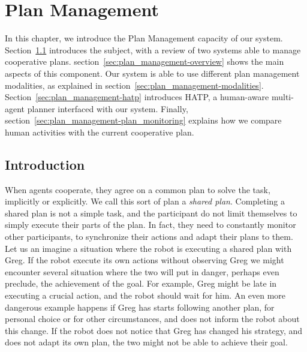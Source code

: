 
\chapter{Plan Management} %

\label{chapter:plan_management} %


In this chapter, we introduce the Plan Management capacity of our system. Section~\ref{sec:plan_management-intro} introduces the subject, with a review of two systems able to manage cooperative plans. section~\ref{sec:plan_management-overview} shows the main aspects of this component. Our system is able to use different plan management modalities, as explained in section~\ref{sec:plan_management-modalities}. Section~\ref{sec:plan_management-hatp} introduces HATP, a human-aware multi-agent planner interfaced with our system. Finally, section~\ref{sec:plan_management-plan_monitoring} explains how we compare human activities with the current cooperative plan.

\section{Introduction}
\label{sec:plan_management-intro}

When agents cooperate, they agree on a common plan to solve the task, implicitly or explicitly. We call this sort of plan a \textit{shared plan}. Completing a shared plan is not a simple task, and the participant do not limit themselves to simply execute their parts of the plan. In fact, they need to constantly monitor other participants, to synchronize their actions and adapt their plans to them. Let us an imagine a situation where the robot is executing a shared plan with Greg. If the robot execute its own actions without observing Greg we might encounter several situation where the two will put in danger, perhaps even preclude, the achievement of the goal. For example, Greg might be late in executing a crucial action, and the robot should wait for him. An even more dangerous example happens if Greg has starts following another plan, for personal choice or for other circumstances, and does not inform the robot about this change. If the robot does not notice that Greg has changed his strategy, and does not adapt its own plan, the two might not be able to achieve their goal.

